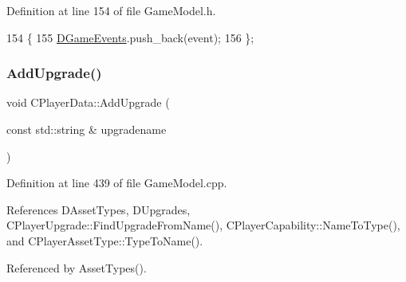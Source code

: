 Definition at line 154 of file Game\+Model.\+h.


\begin{DoxyCode}
154                                                   \{
155             \hyperlink{classCPlayerData_a9a7af43e88055d6d1a384a8817a655a0}{DGameEvents}.push\_back(event);  
156         \};
\end{DoxyCode}
\hypertarget{classCPlayerData_ae66fe7d594267990adf34f9286925efb}{}\label{classCPlayerData_ae66fe7d594267990adf34f9286925efb} 
\subsubsection{\texorpdfstring{Add\+Upgrade()}{AddUpgrade()}}
{\footnotesize\ttfamily void C\+Player\+Data\+::\+Add\+Upgrade (\begin{DoxyParamCaption}\item[{const std\+::string \&}]{upgradename }\end{DoxyParamCaption})}



Definition at line 439 of file Game\+Model.\+cpp.



References D\+Asset\+Types, D\+Upgrades, C\+Player\+Upgrade\+::\+Find\+Upgrade\+From\+Name(), C\+Player\+Capability\+::\+Name\+To\+Type(), and C\+Player\+Asset\+Type\+::\+Type\+To\+Name().



Referenced by Asset\+Types().


